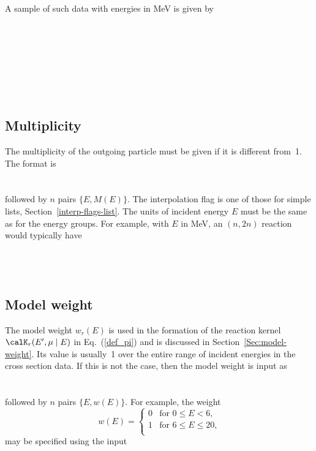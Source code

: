 A sample of such data with energies in MeV is given by\\
 \\
 \\
  \\
  \\
  \\
  \\
  \Input{  \indent }{ $\cdots$}\\

\subsection{Multiplicity}
The multiplicity of the outgoing particle must be given if it is
different from~1.  The format is\\
  \\
  \\
followed by $n$ pairs $\{E, M(E)\}$.  
The interpolation flag is one of those for simple lists,
Section~\ref{interp-flags-list}.  The units of incident energy
$E$ must be the same as for the energy groups.  
For example, with $E$ in MeV, an $(n, 2n)$ reaction
would typically have\\
  \\
  \\
  \\


\subsection{Model weight}
The model weight $w_r(E)$ is used in the formation of the reaction
kernel $\calK_r(E', \mu \mid E)$ in Eq.~(\ref{def_pi}) and is
discussed in Section~\ref{Sec:model-weight}.  Its value
is usually~1 over the entire range of incident energies in the cross
section data.  If this is not the case, then the model weight is input as\\
  \\
  \\
followed by $n$ pairs $\{E, w(E)\}$.   For example, the weight
$$
  w(E) = \begin{cases}
    0 & \text{for $0 \le E < 6$,}\\
    1 & \text{for $6 \le E \le 20$,}\\
  \end{cases}
$$
may be specified using the input\\
   \\
  \\
  \\
  \\
  
